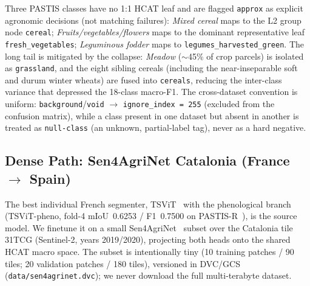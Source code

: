 Three PASTIS classes have no 1:1 HCAT leaf and are flagged \texttt{approx} as explicit
agronomic decisions (not matching failures): \emph{Mixed cereal} maps to the L2 group node
\texttt{cereal}; \emph{Fruits/vegetables/flowers} maps to the dominant representative leaf
\texttt{fresh\_vegetables}; \emph{Leguminous fodder} maps to \texttt{legumes\_harvested\_green}.
The long tail is mitigated by the collapse: \emph{Meadow} ($\sim$45\% of crop parcels) is
isolated as \texttt{grassland}, and the eight sibling cereals (including the
near-inseparable soft and durum winter wheats) are fused into \texttt{cereals}, reducing
the inter-class variance that depressed the 18-class macro-F1. The cross-dataset
convention is uniform: \texttt{background}/\texttt{void} $\rightarrow$
\texttt{ignore\_index = 255} (excluded from the confusion matrix), while a class present in
one dataset but absent in another is treated as \texttt{null-class} (an unknown,
partial-label tag), never as a hard negative.

\subsection{Dense Path: Sen4AgriNet Catalonia (France $\rightarrow$ Spain)}
\label{sec:multiregion:dense}

The best individual French segmenter, TSViT~\cite{tarasiou2023tsvit} with the
phenological branch (TSViT-pheno, fold-4 mIoU~0.6253 / F1~0.7500 on
PASTIS-R~\cite{garnot2021pastis}), is the source model. We finetune it on a small
Sen4AgriNet~\cite{sykas2022sen4agrinet} subset over the Catalonia tile 31TCG
(Sentinel-2, years 2019/2020),
projecting both heads onto the shared HCAT macro space. The subset is intentionally tiny
(10 training patches / 90 tiles; 20 validation patches / 180 tiles), versioned in
DVC/GCS (\texttt{data/sen4agrinet.dvc}); we never download the full multi-terabyte
dataset.

